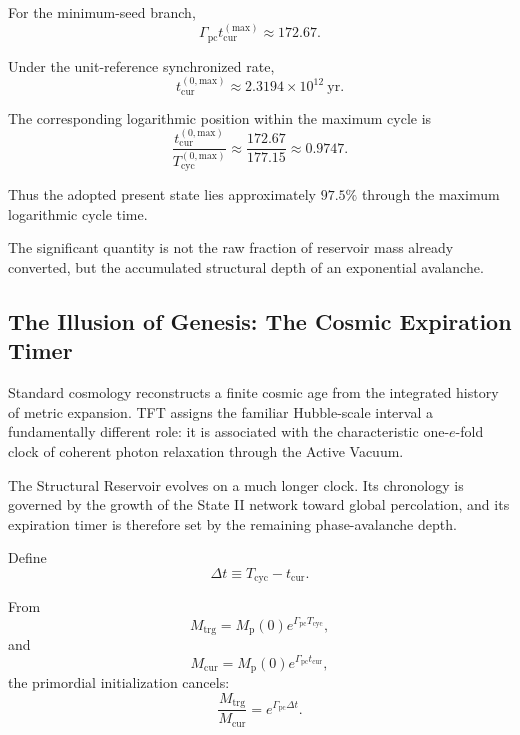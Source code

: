 For the minimum-seed branch,
\begin{equation}
    \Gamma_{\mathrm{pc}}
    t_{\mathrm{cur}}^{(\mathrm{max})}
    \approx
    172.67.
\end{equation}

Under the unit-reference synchronized rate,
\begin{equation}
    t_{\mathrm{cur}}^{(0,\mathrm{max})}
    \approx
    2.3194\times10^{12}\ \mathrm{yr}.
\end{equation}

The corresponding logarithmic position within the maximum cycle is
\begin{equation}
    \frac{
        t_{\mathrm{cur}}^{(0,\mathrm{max})}
    }{
        T_{\mathrm{cyc}}^{(0,\mathrm{max})}
    }
    \approx
    \frac{172.67}{177.15}
    \approx
    0.9747.
\end{equation}

Thus the adopted present state lies approximately $97.5\%$ through the maximum logarithmic cycle time.

The significant quantity is not the raw fraction of reservoir mass already converted, but the accumulated structural depth of an exponential avalanche.


\subsection{The Illusion of Genesis: The Cosmic Expiration Timer}
\label{sec:illusion_of_genesis}
Standard cosmology reconstructs a finite cosmic age from the integrated history of metric expansion. TFT assigns the familiar Hubble-scale interval a fundamentally different role: it is associated with the characteristic one-$e$-fold clock of coherent photon relaxation through the Active Vacuum.

The Structural Reservoir evolves on a much longer clock. Its chronology is governed by the growth of the State II network toward global percolation, and its expiration timer is therefore set by the remaining phase-avalanche depth.

Define
\begin{equation}
    \Delta t
    \equiv
    T_{\mathrm{cyc}}
    -
    t_{\mathrm{cur}}.
\end{equation}

From
\begin{equation}
    M_{\mathrm{trg}}
    =
    M_{\mathrm p}(0)
    e^{\Gamma_{\mathrm{pc}}T_{\mathrm{cyc}}},
\end{equation}
and
\begin{equation}
    M_{\mathrm{cur}}
    =
    M_{\mathrm p}(0)
    e^{\Gamma_{\mathrm{pc}}t_{\mathrm{cur}}},
\end{equation}
the primordial initialization cancels:
\begin{equation}
    \frac{M_{\mathrm{trg}}}
    {M_{\mathrm{cur}}}
    =
    e^{\Gamma_{\mathrm{pc}}\Delta t}.
\end{equation}

